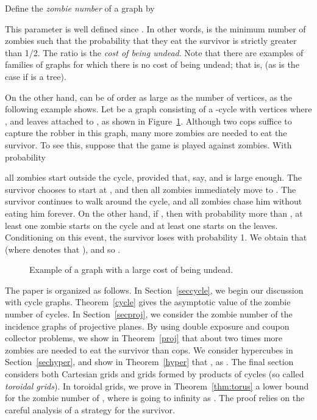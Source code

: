 \documentclass[12pt]{amsart}
\begin{document}
Define the \emph{zombie number} of a graph  by

This parameter is well defined since . In other words,  is the minimum number of zombies such that the probability that they eat the survivor is strictly greater than 1/2. The ratio  is the \emph{cost of being undead}.  Note that there are examples of families of graphs for which there is no cost of being undead; that is,  (as is the case if  is a tree).

On the other hand,  can be of order as large as the number of vertices, as the following example shows. Let  be a graph consisting of a -cycle with vertices  where ,
and  leaves attached to , as shown in Figure~\ref{fig:large}. Although two cops suffice to capture the robber in this graph, many more zombies are needed to eat the survivor. To see this, suppose
that the game is played against  zombies. With probability

all zombies start outside the cycle, provided that, say,  and  is large enough. The survivor chooses to start at , and then all zombies immediately move to . The survivor
continues to walk around the cycle, and all zombies chase him without eating him forever. On the other hand, if , then with probability more than , at least one
zombie starts on the cycle and at least one starts on the leaves. Conditioning on this event, the survivor loses with probability 1. We obtain that  (where  denotes that ), and so .
\begin{figure} [h!]
\begin{center}
\caption{Example of a graph with a large cost of being undead. }\label{fig:large}
\end{center}
\end{figure}

\bigskip

The paper is organized as follows. In Section~\ref{seccycle}, we begin our discussion with cycle graphs.  Theorem~\ref{cycle} gives the asymptotic value of the zombie number of cycles. In
Section~\ref{secproj}, we consider the zombie number of the incidence graphs of projective planes. By using double exposure and coupon collector problems, we show in Theorem~\ref{proj} that about two
times more zombies are needed to eat the survivor than cops. We consider hypercubes  in Section~\ref{sechyper}, and show in Theorem~\ref{hyper} that , as . The final section considers both Cartesian grids and grids formed by products of cycles (so called \emph{toroidal grids}). In toroidal grids, we prove in
Theorem~\ref{thm:torus} a lower bound for the zombie number of , where  is going to infinity as . The proof relies on the careful analysis of a
strategy for the survivor.
\end{document}
